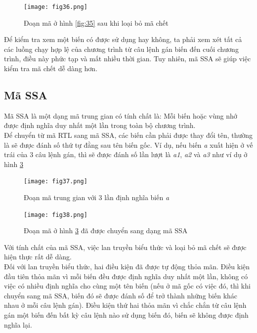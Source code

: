 \begin{figure}[h]
	\centering
	\texttt{[image: fig36.png]}
	\caption{Đoạn mã ở hình \ref{fig:35} sau khi loại bỏ mã chết}
	\label{fig:36}
\end{figure}

Để kiểm tra xem một biến có được sử dụng hay không, ta phải xem xét tất cả các luồng chạy hợp lệ của chương trình từ câu lệnh gán biến đến cuối chương trình, điều này phức tạp và mất nhiều thời gian. Tuy nhiên, mã SSA sẽ giúp việc kiểm tra mã chết dễ dàng hơn.
\subsection{Mã SSA} \label{ssa}

Mã SSA \cite{ssa} là một dạng mã trung gian có tính chất là: Mỗi biến hoặc vùng nhớ được định nghĩa duy nhất một lần trong toàn bộ chương trình. \\

Để chuyển từ mã RTL sang mã SSA, các biến cần phải được thay đổi tên, thường là sẽ được đánh số thứ tự đằng sau tên biến gốc. Ví dụ, nếu biến \textit{a} xuất hiện ở vế trái của 3 câu lệnh gán, thì sẽ được đánh số lần lượt là \textit{a1}, \textit{a2} và \textit{a3} như ví dụ ở hình \ref{fig:38}

\begin{figure}[h]
	\centering
	\texttt{[image: fig37.png]}
	\caption{Đoạn mã trung gian với 3 lần định nghĩa biến \textit{a}}
	\label{fig:37}
\end{figure}

\begin{figure}[h]
	\centering
	\texttt{[image: fig38.png]}
	\caption{Đoạn mã ở hình \ref{fig:38} đã được chuyển sang dạng mã SSA}
	\label{fig:38}
\end{figure}

Với tính chất của mã SSA, việc lan truyền biểu thức và loại bỏ mã chết sẽ được hiện thực rất dễ dàng.\\

Đối với lan truyền biểu thức, hai điều kiện đã được tự động thỏa mãn. Điều kiện đầu tiên thỏa mãn vì mỗi biến đều được định nghĩa duy nhất một lần, không có việc có nhiều định nghĩa cho cùng một tên biến (nếu ở mã gốc có việc đó, thì khi chuyển sang mã SSA, biến đó sẽ được đánh số để trở thành những biến khác nhau ở mỗi câu lệnh gán). Điều kiện thứ hai thỏa mãn vì chắc chắn từ câu lệnh gán một biến đến bất kỳ câu lệnh nào sử dụng biến đó, biến sẽ không được định nghĩa lại.\\

